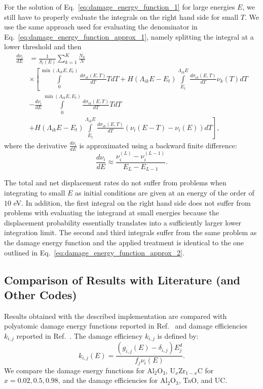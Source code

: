 \documentclass[review]{elsarticle}
\begin{document}
For the solution of Eq.~\ref{eq:damage_energy_function_1} for large energies $E$, we still have to properly evaluate the integrals on the right hand side for small $T$. We use the same approach used for evaluating the denominator in Eq.~\ref{eq:damage_energy_function_approx_1}, namely splitting the integral at a lower threshold and then 
\begin{align}\label{eq:damage_energy_function_approx_2}
    \frac{d \nu_i}{dE}  & = \frac{1}{S_i(E)} \sum\limits_{k=1}^K   \frac{N_k}{N}  \nonumber \\
                                 & \times \left [     
     \int\limits_{0}^{\min(\Lambda_{ik} E, E_t)}  \frac{d \sigma_{ik} (E,T)}{dT} T dT
 +  H(\Lambda_{ik} E - E_t) \int\limits_{E_t}^{\Lambda_{ik} E}  \frac{d \sigma_{ik} (E,T)}{dT}   \nu_k(T)  dT
        \right . \nonumber \\ 
     & - \frac{d \nu_i}{dE }   \int\limits_{0}^{\min(\Lambda_{ik} E, E_t)}  \frac{d \sigma_{ik} (E,T)}{dT} T dT \nonumber \\
       &   \left .      + H(\Lambda_{ik} E - E_t) \int\limits_{E_t}^{\Lambda_{ik} E}  \frac{d \sigma_{ik} (E,T)}{dT}  \left( \nu_i(E-T) - \nu_i(E) \right)  dT  \right ], 
\end{align}
where the derivative $\frac{d \nu_i}{dE}$ is approximated using a backward finite difference:
\begin{equation}
   \frac{d \nu_i}{dE} \approx \frac{\nu_i^{(L)} - \nu_i^{(L-1)}}{E_L - E_{L-1}}.
\end{equation}

The total and net displacement rates do not suffer from problems when integrating to small $E$ as initial conditions are given at an energy of the order of $10$ eV. In addition, the first integral on the right hand side does not suffer from problems with evaluating the integrand at small energies because the displacement probability essentially translates into a sufficiently larger lower integration limit. The second and third integrals suffer from the same problem as the damage energy function and the applied treatment is identical to the one outlined in Eq.~\ref{eq:damage_energy_function_approx_2}.

\subsection{Comparison of Results with Literature (and Other Codes)}
Results obtained with the described implementation are compared with polyatomic damage energy functions reported in Ref.~\cite{PC1980} and damage efficiencies $k_{i,j}$ reported in Ref.~\cite{PC1981}. The damage efficiency $k_{i,j}$ is defined by:
\begin{equation}
   k_{i,j}(E)  =\frac{\left( g_{i,j}(E) - \delta_{i,j} \right) E_j^d}{f_j \nu_i(E)}.
\end{equation}
We compare the damage energy functions for $\text{Al}_2\text{O}_3$, $\text{U}_x\text{Zr}_{1-x}\text{C}$ for $x=0.02, 0.5, 0.98$, and the damage efficiencies for $\text{Al}_2\text{O}_3$, TaO, and UC.
\end{document}
